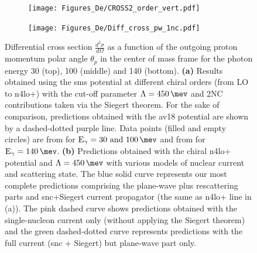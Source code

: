     \begin{figure}[h]
        \centering
        \begin{subfigure}[t]{0.46\textwidth}
            \caption{}
            \texttt{[image: Figures\_De/CROSS2\_order\_vert.pdf]}
            \label{Diff_cross_order}
        \end{subfigure}
        \begin{subfigure}[t]{0.46\textwidth}
            \caption{}
            \texttt{[image: Figures\_De/Diff\_cross\_pw\_1nc.pdf]}
            \label{Diff_cross_pw_1nc}
        \end{subfigure}
        \caption{Differential cross section $\frac{d^2\sigma}{d\Omega}$
        as a function of the outgoing proton momentum polar angle $\theta_p$ in the center of mass frame 
        for the photon energy \SI{30}{\mev} (top), \SI{100}{\mev} (middle) and \SI{140}{\mev} (bottom).
        {\bf (a)} Results obtained using the \gls{sms} potential
        at different chiral orders (from LO to \gls{n4lo+}) with the cut-off parameter $\Lambda=\SI{450}{\mev}$ and 
        2NC contributions taken via the Siegert theorem.
        For the sake of comparison, predictions obtained with the \gls*{av18} potential are shown
        by a dashed-dotted purple line.
        Data points (filled and empty circles) are from \cite{Ying_Experiment_Deut}
        for $\text{E}_\gamma=\SIlist[list-units = single]{30; 100}{\mev}$
        and from \cite{DeSanctis_Experiment_Deut} for $\text{E}_\gamma=\SI{140}{\mev}$.
        {\bf (b)} Predictions obtained with the chiral \gls{n4lo+} potential and $\Lambda=\SI{450}{\mev}$
        with various models of nuclear current and scattering state.
        The blue solid curve represents our most complete predictions
        comprising the plane-wave plus rescattering parts and \gls{snc}+Siegert current propagator 
        (the same as \gls{n4lo+} line in (a)).
        The pink dashed curve shows predictions obtained with
        the single-nucleon current only (without applying the Siegert theorem) and the green dashed-dotted
        curve represents predictions with the full current (\gls{snc} + Siegert) but plane-wave part only.
        }
        \label{Diff_cross_order_pw}
    \end{figure}


